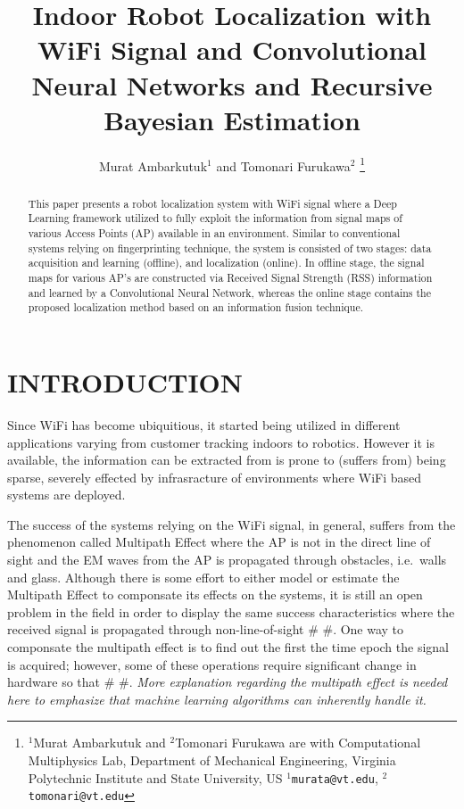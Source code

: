 \documentclass[letterpaper, 10 pt, conference]{ieeeconf}  %
\title{\LARGE \bf
Indoor Robot Localization with WiFi Signal and Convolutional Neural Networks and Recursive Bayesian Estimation
}
\author{Murat Ambarkutuk$^{1}$ and Tomonari Furukawa$^{2}$%
\thanks{$^{1}$Murat Ambarkutuk and $^{2}$Tomonari Furukawa are with Computational Multiphysics Lab, Department of Mechanical Engineering,
        Virginia Polytechnic Institute and State University, US
        {\tt\small $^{1}$murata@vt.edu}, {\tt\small $^{2}$tomonari@vt.edu}}%
}
\begin{document}
\maketitle
\thispagestyle{empty}
\pagestyle{empty}


\begin{abstract}

  This paper presents a robot localization system with WiFi signal where a Deep Learning framework utilized to fully exploit the information from signal maps of various Access Points (AP) available in an environment.
  Similar to conventional systems relying on fingerprinting technique, the system is consisted of two stages: data acquisition and learning (offline), and localization (online).
  In offline stage, the signal maps for various AP's are constructed via Received Signal Strength (RSS) information and learned by a Convolutional Neural Network, whereas the online stage contains the proposed localization method based on an information fusion technique.

\end{abstract}


\section{INTRODUCTION}
Since WiFi has become ubiquitious, it started being utilized in different applications varying from customer tracking indoors to robotics. %
However it is available, the information can be extracted from is prone to (suffers from) being sparse, severely effected by infrasracture of environments where WiFi based systems are deployed.

The success of the systems relying on the WiFi signal, in general, suffers from the phenomenon called Multipath Effect where the AP is not in the direct line of sight and the EM waves from the AP is propagated through obstacles, i.e.~walls and glass.
Although there is some effort to either model or estimate the Multipath Effect to componsate its effects on the systems, it is still an open problem in the field in order to display the same success characteristics where the received signal is propagated through non-line-of-sight \# \#.
One way to componsate the multipath effect is to find out the first the time epoch the signal is acquired; however, some of these operations require significant change in hardware so that  \# \#.
\textit{More explanation regarding the multipath effect is needed here to emphasize that machine learning algorithms can inherently handle it.}
\end{document}
